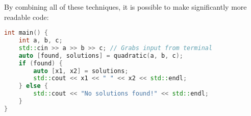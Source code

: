 \documentclass[]{article}
\begin{document}
By combining all of these techniques, it is possible to make significantly more readable code:
\begin{lstlisting}[language=C++]
int main() {
    int a, b, c;
    std::cin >> a >> b >> c; // Grabs input from terminal
    auto [found, solutions] = quadratic(a, b, c);
    if (found) {
        auto [x1, x2] = solutions;
        std::cout << x1 << " " << x2 << std::endl;
    } else {
        std::cout << "No solutions found!" << std::endl;
    }
}
\end{lstlisting}
\end{document}
